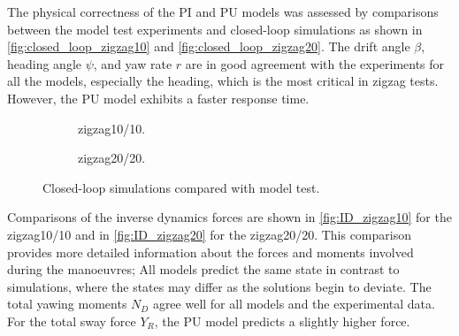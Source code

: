 The physical correctness of the PI and PU models was assessed by comparisons between the model test experiments and closed-loop simulations as shown in \autoref{fig:closed_loop_zigzag10} and \autoref{fig:closed_loop_zigzag20}. The drift angle $\beta$, heading angle $\psi$, and yaw rate $r$ are in good agreement with the experiments for all the models, especially the heading, which is the most critical in zigzag tests. However, the PU model exhibits a faster response time.

\begin{figure}
    \centering
    \begin{subfigure}[b]{0.49\textwidth}
        \centering
        
        \caption{zigzag10/10.}
        \label{fig:closed_loop_zigzag10}
    \end{subfigure}
    \hfill
    \begin{subfigure}[b]{0.49\textwidth}
        \centering
        
        \caption{zigzag20/20.}
        \label{fig:closed_loop_zigzag20}
    \end{subfigure}
    \caption{Closed-loop simulations compared with model test.}
    \label{fig:closed_loop}
\end{figure}
%    
%    
Comparisons of the inverse dynamics forces are shown in \autoref{fig:ID_zigzag10} for the zigzag10/10 and in \autoref{fig:ID_zigzag20} for the zigzag20/20. This comparison provides more detailed information about the forces and moments involved during the manoeuvres; All models predict the same state in contrast to simulations, where the states may differ as the solutions begin to deviate.    
The total yawing moments $N_D$ agree well for all models and the experimental data. For the total sway force $Y_R$, the PU model predicts a slightly higher force.  


